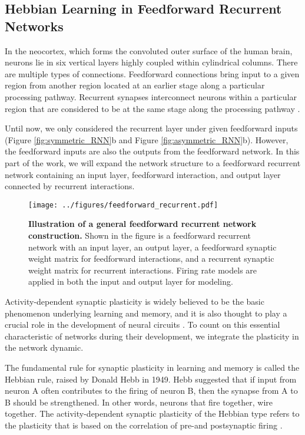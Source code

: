 \documentclass[11pt]{article}
\begin{document}
	\subsection{Hebbian Learning in Feedforward Recurrent Networks} \label{sec:Hebb_learn}
	In the neocortex, which forms the convoluted outer surface of the human brain, neurons lie in six vertical layers highly coupled within cylindrical columns. There are multiple types of connections. Feedforward connections bring input to a given region from another region located at an earlier stage along a particular processing pathway. Recurrent synapses interconnect neurons within a particular region that are considered to be at the same stage along the processing pathway \cite{dayan2005theoretical}. 
	
	Until now, we only considered the recurrent layer under given feedforward inputs (Figure \ref{fig:symmetric_RNN}b and Figure \ref{fig:asymmetric_RNN}b). However, the feedforward inputs are also the outputs from the feedforward network. In this part of the work, we will expand the network structure to a feedforward recurrent network containing an input layer, feedforward interaction, and output layer connected by recurrent interactions.
	
		\begin{figure}[H]
			\centering
			\texttt{[image: ../figures/feedforward\_recurrent.pdf]}
			\caption[Illustration of a general feedforward recurrent network construction]{\textbf{Illustration of a general feedforward recurrent network construction.} Shown in the figure is a feedforward recurrent network with an input layer, an output layer, a feedforward synaptic weight matrix for feedforward interactions, and a recurrent synaptic weight matrix for recurrent interactions. Firing rate models are applied in both the input and output layer for modeling.}
			\label{fig:feedforward_recurrent_network}
		\end{figure} 
	
	Activity-dependent synaptic plasticity is widely believed to be the basic phenomenon underlying learning and memory, and it is also thought to play a crucial role in the development of neural circuits \cite{dayan2005theoretical}. To count on this essential characteristic of networks during their development, we integrate the plasticity in the network dynamic. 
	
	The fundamental rule for synaptic plasticity in learning and memory is called the Hebbian rule, raised by Donald Hebb in 1949. Hebb suggested that if input from neuron A often contributes to the firing of neuron B, then the synapse from A to B should be strengthened. In other words, neurons that fire together, wire together. The activity-dependent synaptic plasticity of the Hebbian type refers to the plasticity that is based on the correlation of pre-and postsynaptic firing \cite{dayan2005theoretical}. 
	
\end{document}
